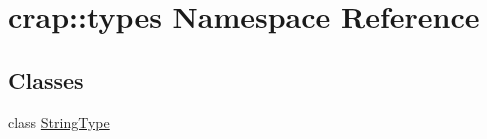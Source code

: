 \hypertarget{namespacecrap_1_1types}{\section{crap\-:\-:types Namespace Reference}
\label{namespacecrap_1_1types}
}
\subsection*{Classes}
\begin{DoxyCompactItemize}
\item 
class \hyperlink{classcrap_1_1types_1_1_string_type}{String\-Type}
\end{DoxyCompactItemize}
